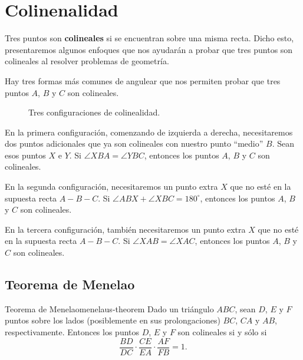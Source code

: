 \newpage
\section{Colinenalidad}

\begin{figure}[H]
    \centering
    
\end{figure}

Tres puntos son \textbf{colineales} si se encuentran sobre una misma recta.
Dicho esto, presentaremos algunos enfoques que nos ayudarán a probar que tres puntos son colineales al resolver problemas de geometría.

Hay tres formas más comunes de angulear que nos permiten probar que tres puntos $A$, $B$ y $C$ son colineales.

\begin{figure}[H]
    \centering
    
    \caption{Tres configuraciones de colinealidad.}
\end{figure}

En la primera configuración, comenzando de izquierda a derecha, necesitaremos dos puntos adicionales que ya son colineales con nuestro punto ``medio'' $B$.
Sean esos puntos $X$ e $Y$.
Si $\angle XBA = \angle YBC$, entonces los puntos $A$, $B$ y $C$ son colineales.

En la segunda configuración, necesitaremos un punto extra $X$ que no esté en la supuesta recta $A - B - C$.
Si $\angle ABX + \angle XBC = 180^\circ$, entonces los puntos $A$, $B$ y $C$ son colineales.

En la tercera configuración, también necesitaremos un punto extra $X$ que no esté en la supuesta recta $A - B - C$.
Si $\angle XAB = \angle XAC$, entonces los puntos $A$, $B$ y $C$ son colineales.




\subsection{Teorema de Menelao}

\begin{section-theorem.tcb}{Teorema de Menelao}{menelaus-theorem}
    Dado un triángulo $ABC$, sean $D$, $E$ y $F$ puntos sobre los lados (posiblemente en sus prolongaciones) $BC$, $CA$ y $AB$, respectivamente.
    Entonces los puntos $D$, $E$ y $F$ son colineales si y sólo si
    \[
        \frac{BD}{DC} \cdot \frac{CE}{EA} \cdot \frac{AF}{FB} = 1.
    \]
\end{section-theorem.tcb}

